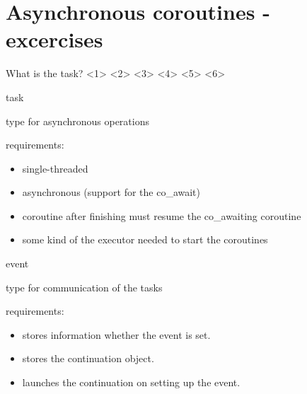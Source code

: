 \documentclass[10pt]{beamer}
\begin{document}
\section{Asynchronous coroutines - excercises}

\begin{frame}{What is the task?}
  <1>
  <2>
  <3>
  <4>
  <5>
  <6>
\end{frame}

\begin{frame}{task}
  \centerline{type for asynchronous operations}
  \vfill
  requirements:
  \begin{itemize}
    \item single-threaded
    \item asynchronous (support for the co\_await)
    \item coroutine after finishing must resume the co\_awaiting coroutine
    \item some kind of the executor needed to start the coroutines
  \end{itemize}
\end{frame}

\begin{frame}{event}
  \centerline{type for communication of the tasks}
  \vfill
  requirements:
  \begin{itemize}
  \item stores information whether the event is set.
  \item stores the continuation object.
  \item launches the continuation on setting up the event.
  \end{itemize}
\end{frame}
\end{document}
